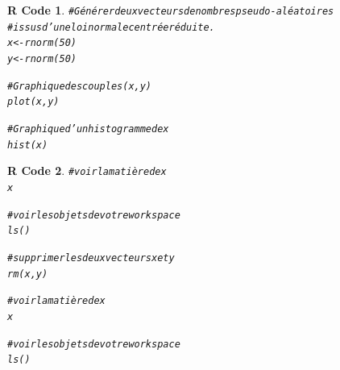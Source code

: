 \documentclass[11pt]{beamer}\usepackage[]{graphicx}\usepackage[]{color}
\makeatletter
\newcommand{\hlnum}[1]{\textcolor[rgb]{0.063,0.58,0.627}{#1}}%
\newcommand{\hlcom}[1]{\textcolor[rgb]{0.588,0.588,0.588}{#1}}%
\newcommand{\hlstd}[1]{\textcolor[rgb]{0.196,0.196,0.196}{#1}}%
\newcommand{\hlkwb}[1]{\textcolor[rgb]{0.627,0,0.314}{#1}}%
\newcommand{\hlkwd}[1]{\textcolor[rgb]{0.78,0.227,0.412}{#1}}%
\newenvironment{kframe}{%
 \def\at@end@of@kframe{}%
 \ifinner\ifhmode%
  \def\at@end@of@kframe{\end{minipage}}%
  \begin{minipage}{\columnwidth}%
 \fi\fi%
 \def\FrameCommand##1{\hskip\@totalleftmargin \hskip-\fboxsep
 \colorbox{shadecolor}{##1}\hskip-\fboxsep
     \hskip-\linewidth \hskip-\@totalleftmargin \hskip\columnwidth}%
 \MakeFramed {\advance\hsize-\width
   \@totalleftmargin\z@ \linewidth\hsize
   \@setminipage}}%
 {\par\unskip\endMakeFramed%
 \at@end@of@kframe}
\newenvironment{knitrout}{}{} %
\newtheorem{rcode}{R Code}[section]
\makeatother
\begin{document}
\begin{frame}
\begin{knitrout}
\color{fgcolor}\begin{kframe}
\begin{rcode}\begin{alltt}
\hlcom{# Générer deux vecteurs de nombres pseudo-aléatoires}
\hlcom{# issus d’une loi normale centrée réduite.}
\hlstd{x} \hlkwb{<-} \hlkwd{rnorm}\hlstd{(}\hlnum{50}\hlstd{)}
\hlstd{y} \hlkwb{<-} \hlkwd{rnorm}\hlstd{(}\hlnum{50}\hlstd{)}

\hlcom{# Graphique des couples (x, y)}
\hlkwd{plot}\hlstd{(x, y)}

\hlcom{# Graphique d'un histogramme de x}
\hlkwd{hist}\hlstd{(x)}
\end{alltt}
\end{rcode}\end{kframe}
\end{knitrout}
\end{frame}


\begin{frame}
\begin{knitrout}
\color{fgcolor}\begin{kframe}
\begin{rcode}\begin{alltt}
\hlcom{# voir la matière de x}
\hlstd{x}

\hlcom{# voir les objets de votre workspace}
\hlkwd{ls}\hlstd{()}

\hlcom{# supprimer les deux vecteurs x et y}
\hlkwd{rm}\hlstd{(x,y)}

\hlcom{# voir la matière de x}
\hlstd{x}

\hlcom{# voir les objets de votre workspace}
\hlkwd{ls}\hlstd{()}
\end{alltt}
\end{rcode}\end{kframe}
\end{knitrout}
\end{frame}
\end{document}
